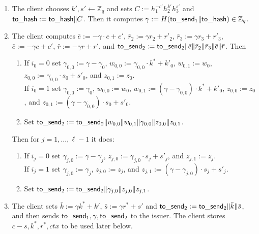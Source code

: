 \documentclass[11pt]{article}
\def\com{{\sf com}}
\def\send{{\sf to}\mbox{\_}{\sf send}}
\def\hash{{\sf to}\mbox{\_}{\sf hash}}
\def\Z{{\mathbb Z}}
\def\Z{{\mathbb Z}}
\begin{document}
\begin{itemize}
\begin{enumerate}
         \medskip{} If we let $K':=\prod_{i=0}^{\ell-1} \com_i^{2^i}$ and $\com:=h_1^s\cdot K'$ (both values that can be computed by the verifier), then $K'=h_1^{c-s} h_2^{k^*} h_3^{r^*}$ with $c-s\geq 0$ and $\com=h_1^c h_2^{k^*} h_3^{r^*}$. In the next step the client proves that $\com$ is a commitment to the same value $c$ as in its token.
        
    \item The client chooses $k', s'\leftarrow \Z_q$ and sets $C:=h_1^{-c'}h_2^{k'} h_3^{s'}$ and $\hash:=\hash\|C$. Then it computes $\gamma := H(\send_1\|\hash) \in \Z_q$.
    
        \item The client computes $\bar e := -\gamma \cdot e + e'$, $\bar r_2 := \gamma r_2 + r'_2$, $\bar r_3:=\gamma r_3 + r'_3$, $\bar c:=-\gamma c+c'$, $\bar r:=-\gamma r + r'$, and $\send_2:=\send_2\|\bar e\| \bar r_2 \| \bar r_3 \| \bar c \| \bar r$. 
        Then
  \begin{enumerate}
    \item If $i_0=0$ set $\gamma_{0,0}:=\gamma-\gamma_0$, $w_{0,0}:=\gamma_{0,0} \cdot k^*+k'_0$, 
    $w_{0,1}:=w_0$,
    $z_{0,0}:=\gamma_{0,0}\cdot s_0+s'_0$, and $z_{0,1}:=z_0$.\\
    If $i_0=1$ set $\gamma_{0,0}:=\gamma_0$, $w_{0,0}:=w_0$, $w_{0,1}:= (\gamma-\gamma_{0,0}) \cdot k^*+k'_0$,
    $z_{0,0}:=z_0$, and $z_{0,1}:=(\gamma-\gamma_{0,0}) \cdot s_0+s'_0$. 
    \item Set $\send_2:=\send_2\|w_{0,0}\|w_{0,1}\|\gamma_{0,0}\|z_{0,0}\|z_{0,1}$.
\end{enumerate}      
        Then for $j=1, \ldots, \ell-1$ it does:
\begin{enumerate}
    \item If $i_j=0$ set $\gamma_{j,0}:=\gamma-\gamma_j$, $z_{j,0}:=\gamma_{j,0}\cdot s_j+s'_j$, and $z_{j,1}:=z_j$.\\
    If $i_j=1$ set $\gamma_{j,0}:=\gamma_j$, %
    $z_{j,0}:=z_j$, and $z_{j,1}:=(\gamma-\gamma_{j,0}) \cdot s_j+s'_j$. 
    \item Set $\send_2:=\send_2\|\gamma_{j,0}\|z_{j,0}\|z_{j,1}$.
\end{enumerate}
\item The client sets $\bar k:= \gamma k^* + k'$, $\bar s := \gamma r^* + s'$ and $\send_2:=\send_2\|\bar k\|\bar s$, and then sends $\send_1, \gamma, \send_2$ to the issuer.
The client stores $c-s, k^*, r^*, \mathit{ctx}$ to be used later below.



\end{enumerate}
\end{itemize}
\end{document}
